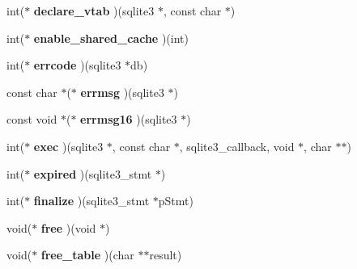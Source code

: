 \begin{DoxyCompactItemize}
int($\ast$ {\bfseries declare\+\_\+vtab} )(sqlite3 $\ast$, const char $\ast$)
\item 
\mbox{\label{structsqlite3__api__routines_a3e6b7bbdd68cde43ef4afffd73e957ea}} 
int($\ast$ {\bfseries enable\+\_\+shared\+\_\+cache} )(int)
\item 
\mbox{\label{structsqlite3__api__routines_a0f1cf42108e6d872d03b78eaf27dfc45}} 
int($\ast$ {\bfseries errcode} )(sqlite3 $\ast$db)
\item 
\mbox{\label{structsqlite3__api__routines_a953d37f24ded9d93449f1d0eb64b8894}} 
const char $\ast$($\ast$ {\bfseries errmsg} )(sqlite3 $\ast$)
\item 
\mbox{\label{structsqlite3__api__routines_a06f862750a8e1e1b21a942cc483c4f71}} 
const void $\ast$($\ast$ {\bfseries errmsg16} )(sqlite3 $\ast$)
\item 
\mbox{\label{structsqlite3__api__routines_a16e1fe4f9dccfe8da742d7087822d379}} 
int($\ast$ {\bfseries exec} )(sqlite3 $\ast$, const char $\ast$, sqlite3\+\_\+callback, void $\ast$, char $\ast$$\ast$)
\item 
\mbox{\label{structsqlite3__api__routines_a574080049ce24e639e7487bcfc74e06a}} 
int($\ast$ {\bfseries expired} )(sqlite3\+\_\+stmt $\ast$)
\item 
\mbox{\label{structsqlite3__api__routines_ad7cee4127bfd0583ccfea40943858de2}} 
int($\ast$ {\bfseries finalize} )(sqlite3\+\_\+stmt $\ast$p\+Stmt)
\item 
\mbox{\label{structsqlite3__api__routines_a5778783c18a96cff28a516168db77ae9}} 
void($\ast$ {\bfseries free} )(void $\ast$)
\item 
\mbox{\label{structsqlite3__api__routines_a16d39862f10f54f34e2d52b4da51fdac}} 
void($\ast$ {\bfseries free\+\_\+table} )(char $\ast$$\ast$result)
\item 
\mbox{\label{structsqlite3__api__routines_a8724984acc7ccfefaa17f04a739fc396}} 

\end{DoxyCompactItemize}
